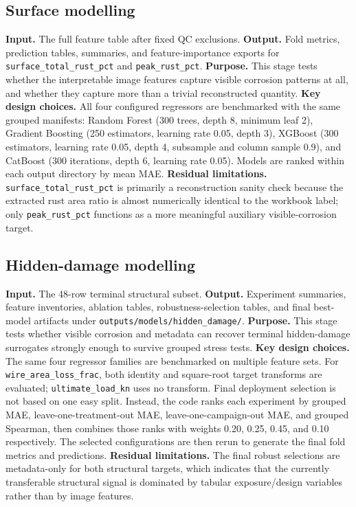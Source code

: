 \documentclass[10pt,a4paper,twocolumn]{article}
\begin{document}
\subsection{Surface modelling}

\textbf{Input.} The full feature table after fixed QC exclusions. \textbf{Output.} Fold metrics, prediction tables, summaries, and feature-importance exports for \texttt{surface\_total\_rust\_pct} and \texttt{peak\_rust\_pct}. \textbf{Purpose.} This stage tests whether the interpretable image features capture visible corrosion patterns at all, and whether they capture more than a trivial reconstructed quantity. \textbf{Key design choices.} All four configured regressors are benchmarked with the same grouped manifests: Random Forest (300 trees, depth 8, minimum leaf 2), Gradient Boosting (250 estimators, learning rate 0.05, depth 3), XGBoost (300 estimators, learning rate 0.05, depth 4, subsample and column sample 0.9), and CatBoost (300 iterations, depth 6, learning rate 0.05). Models are ranked within each output directory by mean MAE. \textbf{Residual limitations.} \texttt{surface\_total\_rust\_pct} is primarily a reconstruction sanity check because the extracted rust area ratio is almost numerically identical to the workbook label; only \texttt{peak\_rust\_pct} functions as a more meaningful auxiliary visible-corrosion target.

\subsection{Hidden-damage modelling}

\textbf{Input.} The 48-row terminal structural subset. \textbf{Output.} Experiment summaries, feature inventories, ablation tables, robustness-selection tables, and final best-model artifacts under \texttt{outputs/models/hidden\_damage/}. \textbf{Purpose.} This stage tests whether visible corrosion and metadata can recover terminal hidden-damage surrogates strongly enough to survive grouped stress tests. \textbf{Key design choices.} The same four regressor families are benchmarked on multiple feature sets. For \texttt{wire\_area\_loss\_frac}, both identity and square-root target transforms are evaluated; \texttt{ultimate\_load\_kn} uses no transform. Final deployment selection is not based on one easy split. Instead, the code ranks each experiment by grouped MAE, leave-one-treatment-out MAE, leave-one-campaign-out MAE, and grouped Spearman, then combines those ranks with weights 0.20, 0.25, 0.45, and 0.10 respectively. The selected configurations are then rerun to generate the final fold metrics and predictions. \textbf{Residual limitations.} The final robust selections are metadata-only for both structural targets, which indicates that the currently transferable structural signal is dominated by tabular exposure/design variables rather than by image features.
\end{document}
